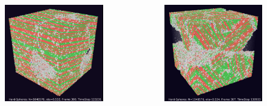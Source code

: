 \documentclass[smaller,notes=hide]{beamer}
\begin{document}
\begin{frame}
\frametitle{\makebox[0.1cm]{}}
\begin{center}
\end{center}
\begin{columns}
\begin{figure}[h]
\centering
\includegraphics[width=0.8 \linewidth]{animation_poster_532_cc.png}
\end{figure}


\begin{figure}[h]
\centering
\includegraphics[width=0.8 \linewidth]{animation_poster_534_cc.png}
\end{figure}


\end{columns}
\end{frame}
\end{document}

